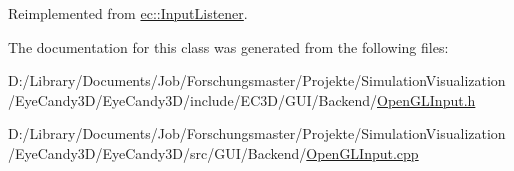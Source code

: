 Reimplemented from \mbox{\hyperlink{classec_1_1_input_listener_a9ceaefc79c6b0b260e88454616137840}{ec\+::\+Input\+Listener}}.



The documentation for this class was generated from the following files\+:\begin{DoxyCompactItemize}
\item 
D\+:/\+Library/\+Documents/\+Job/\+Forschungsmaster/\+Projekte/\+Simulation\+Visualization/\+Eye\+Candy3\+D/\+Eye\+Candy3\+D/include/\+E\+C3\+D/\+G\+U\+I/\+Backend/\mbox{\hyperlink{_open_g_l_input_8h}{Open\+G\+L\+Input.\+h}}\item 
D\+:/\+Library/\+Documents/\+Job/\+Forschungsmaster/\+Projekte/\+Simulation\+Visualization/\+Eye\+Candy3\+D/\+Eye\+Candy3\+D/src/\+G\+U\+I/\+Backend/\mbox{\hyperlink{_open_g_l_input_8cpp}{Open\+G\+L\+Input.\+cpp}}\end{DoxyCompactItemize}
